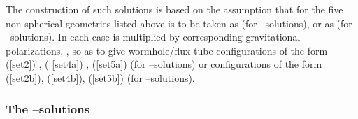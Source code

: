 \documentclass[a4paper,preprint,prabib,aps]{revtex4}
\begin{document}
The construction of such solutions is based on the assumption that \coordHE{} for the five non-spherical geometries listed above is to be
taken as \coordHE{} (for \myHighlight{$\chi $}\coordHE{}--solutions), or as \coordHE{} (for \coordHE{}--solutions). In each case \coordHE{}
is multiplied by corresponding gravitational polarizations, \coordHE{},
so as to give wormhole/flux tube configurations of the form (\ref{set2}) , (%
\ref{set4a}) , (\ref{set5a}) (for \myHighlight{$\chi $}\coordHE{}--solutions) or configurations of
the form (\ref{set2b}), (\ref{set4b}), (\ref{set5b}) (for \coordHE{}%
--solutions).

\subsubsection{The \myHighlight{$\protect\chi$}\coordHE{}--solutions}
\end{document}
